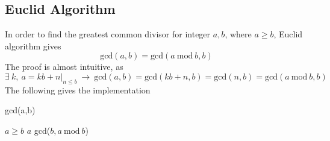 \documentclass[11pt]{article}
\begin{document}
\subsection{Euclid Algorithm}
In order to find the greatest common divisor for integer $a, b$, where $a \geq b$, Euclid algorithm gives
\begin{equation}
    \text{gcd}(a,b) = \text{gcd}(a~\text{mod}~b, b)
\end{equation}
The proof is almost intuitive, as
\begin{equation}
    \exists~k,~a = kb + n\big|_{n \leq b}~\rightarrow~\text{gcd}(a,b) = \text{gcd}(kb+n,b) = \text{gcd}(n, b) = \text{gcd}(a~\text{mod}~b,b)
\end{equation}
The following gives the implementation
\begin{algorithm} 
	\caption{gcd(a,b)} 
	\label{gcd} 
	\begin{algorithmic}
		\REQUIRE $a \geq b$ 
		\RETURN $a$
		\ELSE
		\RETURN gcd($b, a~\text{mod}~b$)
		\ENDIF
	\end{algorithmic} 
\end{algorithm}
\end{document}
